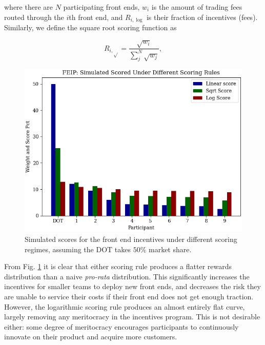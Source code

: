         where there are $N$ participating front ends, $w_i$ is the amount of trading fees routed through the $i$th front end, and $R_{i, \log}$ is their fraction of incentives (fees). Similarly, we define the square root scoring function as

        \begin{equation} \label{eq:sqrtscore}
            R_{i, \sqrt{}} = \frac{\sqrt{w_i}}{\sum_j^N{\sqrt{w_j}}}, 
        \end{equation}


        \begin{figure}[H]
            \centering
            \includegraphics[width=0.7\linewidth]{figs/simmed_scores.png}
            \caption{Simulated scores for the front end incentives under different scoring regimes, assuming the DOT takes $50\%$ market share.}
            \label{fig:simmed_scores}
        \end{figure}

        From Fig. \ref{fig:simmed_scores} it is clear that either scoring rule produces a flatter rewards distribution than a naive \textit{pro-rata} distribution. This significantly increases the incentives for smaller teams to deploy new front ends, and decreases the risk they are unable to service their costs if their front end does not get enough traction. However, the logarithmic scoring rule produces an almost entirely flat curve, largely removing any meritocracy in the incentives program. This is not desirable either: some degree of meritocracy encourages participants to continuously innovate on their product and acquire more customers.

